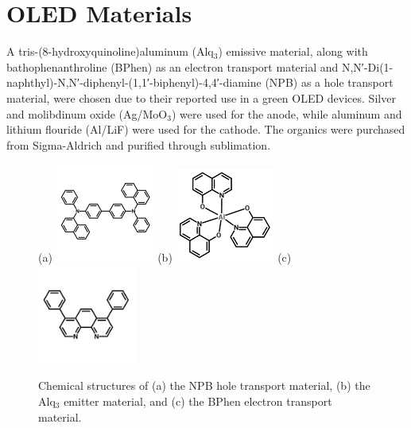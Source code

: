 \documentclass{report}
\begin{document}
    \section{OLED Materials} \label{materials}
    A tris-(8-hydroxyquinoline)aluminum (Alq$_3$) emissive material, along with bathophenanthroline (BPhen) as an electron transport material and N,N′-Di(1-naphthyl)-N,N′-diphenyl-(1,1′-biphenyl)-4,4′-diamine (NPB) as a hole transport material, were chosen due to their reported use in a green OLED devices.\cite{Cai2011,Matsushima2008} Silver and molibdinum oxide (Ag/MoO$_3$) were used for the anode, while aluminum and lithium flouride (Al/LiF) were used for the cathode. The organics were purchased from Sigma-Aldrich and purified through sublimation.\\
    \begin{figure}[h!]
        \centering
        (a)
        \includegraphics[width=0.29\textwidth]{images/npb_structure.jpg}
        (b)
        \includegraphics[width=0.29\textwidth]{images/alq3_structure.png}
        (c)
        \includegraphics[width=0.29\textwidth]{images/bphen_structure.jpg}
        \caption{Chemical structures of (a) the NPB hole transport material, (b) the Alq$_3$ emitter material, and (c) the BPhen electron transport material.}
        \label{fig:structures}
    \end{figure}
    \newpage
\end{document}
